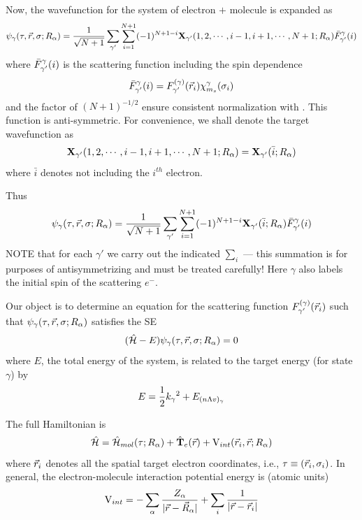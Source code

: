 \documentclass[aps,pra,groupedaddress,12pt,
               amsfonts,amssymb,
               preprint
    ]{revtex4}
\begin{document}
Now, the wavefunction for the system of electron $+$ molecule is
expanded as
\begin{equation}
  \label{eq:emw}
  \psi_\gamma(\tau,\vec{r},\sigma;R_\alpha) = \dfrac{1}{\sqrt{N+1}}\sum_{\gamma'}
         \sum_{i=1}^{N+1}(-1)^{N+1-i}\mathbf{X}_{\gamma'}(1,2,\cdots,i-1,i+1,\cdots,N+1;R_\alpha)\bar{F}_{\gamma'}^{\gamma}(i)
\end{equation}
where $\bar{F}_{\gamma'}^{\gamma}(i)$ is the scattering function including the spin dependence
\begin{equation}
  \label{eq:sfs}
  \bar{F}_{\gamma'}^{\gamma}(i)=F_{\gamma'}^{(\gamma)}(\vec{r}_{i})\chi_{m_s}^\gamma(\sigma_i)
\end{equation}
and the factor of $(N+1)^{-1/2}$ ensure consistent normalization with
. This function is anti-symmetric. For convenience, we shall
denote the target wavefunction as
\begin{equation}
  \label{eq:mwgb}
  \mathbf{X}_{\gamma'}(1,2,\cdots,i-1,i+1,\cdots,N+1;R_\alpha) = \mathbf{X}_{\gamma'}(\bar{i};R_\alpha)
\end{equation}
where $\bar{i}$ denotes not including the $i^{th}$ electron.

Thus
\begin{equation}
  \label{eq:emwb}
  \psi_\gamma(\tau,\vec{r},\sigma;R_\alpha) = \dfrac{1}{\sqrt{N+1}}\sum_{\gamma'}
         \sum_{i=1}^{N+1}(-1)^{N+1-i}\mathbf{X}_{\gamma'}(\bar{i};R_\alpha)\bar{F}_{\gamma'}^{\gamma}(i)
\end{equation}
NOTE that for each $\gamma'$ we carry out the indicated $\sum_i$ ---
this summation is for purposes of antisymmetrizing and must be treated
carefully! Here $\gamma$ also labels the initial spin of the scattering
$e^-$. 

Our object is to determine an equation for the scattering function
$F_{\gamma'}^{(\gamma)}(\vec{r}_{i})$ such that $\psi_\gamma(\tau,\vec{r},\sigma;R_\alpha)$ satisfies the SE
\begin{equation}
  \label{eq:emse}
  (\hat{\mathcal{H}} - E)\psi_\gamma(\tau,\vec{r},\sigma;R_\alpha) = 0
\end{equation}
where $E$, the total energy of the system, is related to the target
energy (for state $\gamma$) by
\begin{equation}
  \label{eq:eme}
  E = \dfrac{1}{2}k_\gamma{}^2 + E_{(n\Lambda v)_\gamma}
\end{equation}

The full Hamiltonian is
\begin{equation}
  \label{eq:fham}
  \hat{\mathcal{H}} = \hat{\mathcal{H}}_{mol}(\tau;R_\alpha) + \hat{\mathbf{T}}_e(\vec{r}) + \mathrm{V}_{int}(\vec{r}_{i},\vec{r};R_\alpha)
\end{equation}
where $\vec{r}_{i}$ denotes all the spatial target electron coordinates, i.e.,
$\tau\equiv(\vec{r}_{i},\sigma_i)$. In general, the electron-molecule
interaction potential energy is (atomic units)
\begin{equation}
  \label{eq:vint}
  \mathrm{V}_{int} = -\sum_\alpha\frac{Z_\alpha}{|\vec{r}-\vec{R}_\alpha|} 
          +\sum_i\dfrac{1}{|\vec{r}-\vec{r}_{i}|}
\end{equation}
\end{document}
